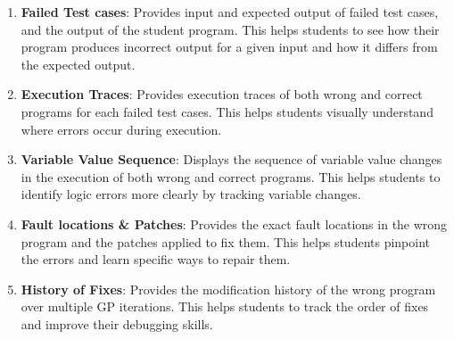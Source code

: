 \documentclass[10pt,conference]{IEEEtran}
\begin{document}
        \begin{enumerate}
            \item \textbf{Failed Test cases}: Provides input and expected output of failed test cases, and the output of the student program. This helps students to see how their program produces incorrect output for a given input and how it differs from the expected output.
            
            \item \textbf{Execution Traces}: Provides execution traces of both wrong and correct programs for each failed test cases. This helps students visually understand where errors occur during execution.
            
            \item \textbf{Variable Value Sequence}: Displays the sequence of variable value changes in the execution of both wrong and correct programs. This helps students to identify logic errors more clearly by tracking variable changes.

            \item \textbf{Fault locations \& Patches}: Provides the exact fault locations in the wrong program and the patches applied to fix them. This helps students pinpoint the errors and learn specific ways to repair them.
            
            \item \textbf{History of Fixes}: Provides the modification history of the wrong program over multiple GP iterations. This helps students to track the order of fixes and improve their debugging skills.
        \end{enumerate}
\end{document}
